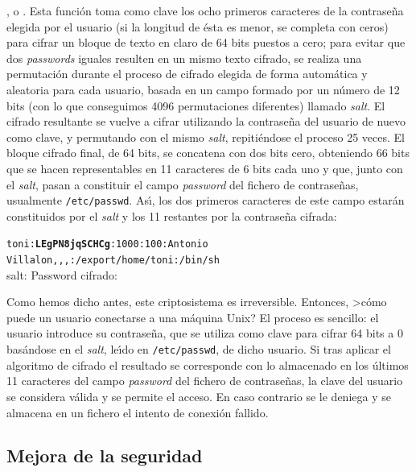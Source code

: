 \cite{kn:mor79}, \cite{kn:fel90} o \cite{kn:spa96}. Esta funci\'on
toma como clave los ocho primeros caracteres de la contrase\~na elegida por el 
usuario (si la longitud de \'esta es menor, se completa con ceros) para cifrar 
un bloque de 
texto en claro de 64 bits puestos a cero; para evitar que dos {\it passwords}
iguales resulten en un mismo texto cifrado, se realiza una permutaci\'on durante
el proceso de cifrado elegida de forma autom\'atica y aleatoria para cada 
usuario, basada en un campo formado por un n\'umero de 12 bits (con lo que
conseguimos 4096 permutaciones diferentes) llamado {\it salt}.
El cifrado resultante se vuelve a cifrar utilizando la contrase\~na del 
usuario de nuevo como clave, y permutando con el mismo {\it salt}, 
repiti\'endose el 
proceso 25 veces. El bloque cifrado final, de 64 bits, se concatena con dos 
bits cero, obteniendo 66 bits que se hacen representables en 11 caracteres de 6 
bits cada uno y que, junto con el {\it salt}, pasan a constituir el campo {\it 
password} del fichero de contrase\~nas, usualmente {\tt /etc/passwd}. As\'{\i}, 
los dos primeros caracteres de este campo estar\'an constituidos por el {\it 
salt} y los 11 restantes por la contrase\~na cifrada:
\begin{center}
{\tt toni:{\bf LEgPN8jqSCHCg}:1000:100:Antonio Villalon,,,:/export/home/toni:/bin/sh}\vspace{5pt}\\
{\sc salt:} \hspace{50pt}
{\sc Password cifrado:} 
\end{center}
Como hemos dicho antes, este criptosistema es irreversible. Entonces, >c\'omo 
puede un usuario conectarse a una m\'aquina Unix? El proceso es sencillo: el 
usuario 
introduce su contrase\~na, que se utiliza como clave para cifrar 64 bits a 0
bas\'andose en el {\it salt}, le\'{\i}do en {\tt /etc/passwd}, de dicho usuario.
Si tras aplicar el algoritmo de 
cifrado el resultado se corresponde con lo almacenado en los \'ultimos 11 
caracteres del campo {\it password} del fichero de contrase\~nas, la clave del 
usuario se considera v\'alida y se permite el acceso. En caso contrario se le
deniega y se almacena en un fichero el intento de conexi\'on fallido.
\subsection{Mejora de la seguridad}
